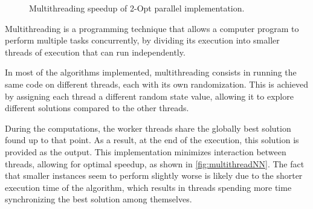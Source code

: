 \begin{figure}[htbp]
    \centering
	\caption{Multithreading speedup of 2-Opt parallel implementation.} \label{fig:multithread2opt}
\end{figure}

Multithreading is a programming technique that allows a computer program to perform multiple tasks concurrently, by dividing its execution into smaller threads of execution that can run independently.

In most of the algorithms implemented, multithreading consists in running the same code on different threads, each with its own randomization.
This is achieved by assigning each thread a different random state value, allowing it to explore different solutions compared to the other threads.

During the computations, the worker threads share the globally best solution found up to that point.
As a result, at the end of the execution, this solution is provided as the output.
This implementation minimizes interaction between threads, allowing for optimal speedup, as shown in \figurename{ \ref{fig:multithreadNN}}.
The fact that smaller instances seem to perform slightly worse is likely due to the shorter execution time of the algorithm, which results in threads spending more time synchronizing the best solution among themselves.

